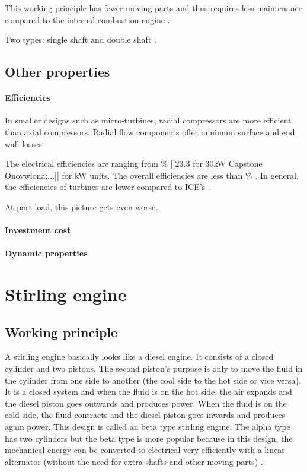 This working principle has fewer moving parts and thus requires less maintenance compared to the internal combustion engine \cite{Onovwiona2006}.

Two types: single shaft and double shaft \cite{Zhu2002}.
\subsection{Other properties}
\paragraph{Efficiencies}
In smaller designs such as micro-turbines, radial compressors are more efficient than axial compressors. Radial flow components offer minimum surface and end wall losses \cite{Onovwiona2006}.

The electrical efficiencies are ranging from \unit[20-25]{\%} [[23.3 for 30kW Capstone Onovwiona;...]] for \unit[10-30]{kW} units. The overall efficiencies are less than \unit[80]{\%} \cite{Onovwiona2006}. In general, the efficiencies of turbines are lower compared to ICE's \cite{Onovwiona2006}.

At part load, this picture gets even worse.
\paragraph{Investment cost}
\paragraph{Dynamic properties}

\section{Stirling engine}
\subsection{Working principle}
A stirling engine basically looks like a diesel engine. It consists of a closed cylinder and two pistons. The second piston's purpose is only to move the fluid in the cylinder from one side to another (the cool side to the hot side or vice versa). It is a closed system and when the fluid is on the hot side, the air expands and the diesel piston goes outwards and produces power. When the fluid is on the cold side, the fluid contracts and the diesel piston goes inwards and produces again power. This design is called an beta  type stirling engine. The alpha type has two cylinders but the beta type is more popular because in this design, the mechanical energy can be converted to electrical very efficiently with a linear alternator (without the need for extra shafts and other moving parts) \cite{Onovwiona2006}.

